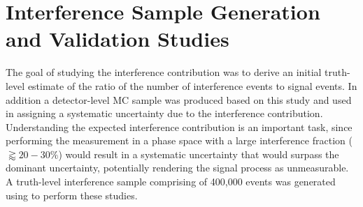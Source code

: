 %
\section{Interference Sample Generation and Validation Studies\label{sec:vbswy:interference}}

The goal of studying the interference contribution was to derive an initial truth-level estimate of the ratio of the number of interference events to signal events. In addition a detector-level MC sample was produced based on this study and used in assigning a systematic uncertainty due to the interference contribution. Understanding the expected interference contribution is an important task, since performing the measurement in a phase space with a large interference fraction ($\gtrapprox20-30\%$) would result in a systematic uncertainty that would surpass the dominant uncertainty, potentially rendering the signal process as unmeasurable. A truth-level interference sample comprising of 400,000 events was generated using \MADGRAPH to perform these studies.

